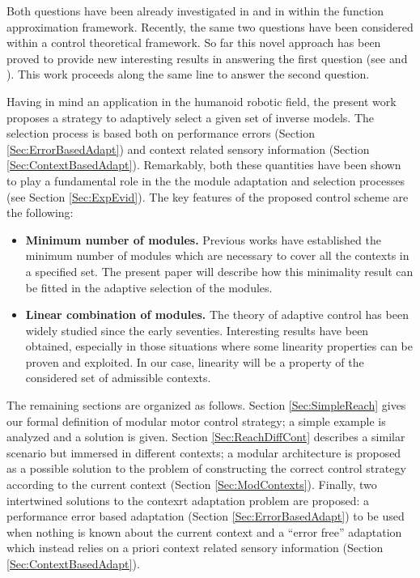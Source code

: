 \documentclass{svmult}
\begin{document}
Both questions have been already investigated in
\cite{WolpertKawato1998} and in \cite{MussaIvaldi1992BiolCyb} within
the function approximation framework. Recently, the same two
questions have been considered \cite{NoriBiolCyb2005} within a
control theoretical framework. So far this novel approach has
been proved to provide new interesting results in answering the
first question (see \cite{NoriFrezzaCdc04} and
\cite{NoriPhDThesis}). This work  proceeds along the
same line to answer the second question. 

Having in mind an application in the humanoid robotic field, the present
work proposes a strategy to adaptively select a given set of inverse models. 
The selection process is based both on performance errors (Section 
\ref{Sec:ErrorBasedAdapt}) and context related sensory information 
(Section \ref{Sec:ContextBasedAdapt}). Remarkably, 
both these quantities have been shown to play a fundamental 
role in the the module adaptation and selection processes (see Section
\ref{Sec:ExpEvid}). The key features of the proposed control scheme are 
the following:

\begin{itemize}

\item \textbf{Minimum number of modules.} Previous works \cite{NoriPhDThesis}
have established the minimum number of modules which are necessary
to cover all the contexts in a specified set. The present paper will
describe how this minimality result can be fitted in the adaptive
selection of the modules.

\item \textbf{Linear combination of modules.} The theory of adaptive
control has been widely studied since the early seventies.
Interesting results have been obtained, especially in those
situations where some linearity properties can be proven and
exploited. In our case, linearity will be a property of the
considered set of admissible contexts.
\end{itemize}

The remaining sections are organized as follows. Section
\ref{Sec:SimpleReach} gives our formal definition of 
modular motor control strategy; a simple example is
analyzed and a solution is given. Section \ref{Sec:ReachDiffCont}
describes a similar scenario but immersed in different contexts;
a modular architecture is proposed as a possible solution
to the problem of constructing the correct control strategy according to the
current context (Section \ref{Sec:ModContexts}). Finally, 
two intertwined solutions to the contexrt adaptation problem are proposed:
a performance error based adaptation (Section \ref{Sec:ErrorBasedAdapt}) to be used
when nothing is known about the current context and a 
``error free'' adaptation which instead relies on a priori 
context related sensory information (Section \ref{Sec:ContextBasedAdapt}).
\end{document}
